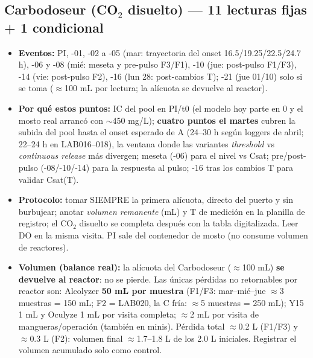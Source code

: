 \documentclass[10pt,landscape]{article}
\begin{document}
\subsection*{Carbodoseur (CO$_2$ disuelto) — 11 lecturas fijas + 1 condicional}
\begin{itemize}\setlength{\itemsep}{1pt}
\item \textbf{Eventos:} PI, -01, -02 a -05 (mar: trayectoria del onset 16.5/19.25/22.5/24.7 h), -06 y -08 (mié: meseta y pre-pulso F3/F1), -10 (jue: post-pulso F1/F3), -14 (vie: post-pulso F2), -16 (lun 28: post-cambios T); -21 (jue 01/10) solo si se toma ($\approx$100 mL por lectura; la alícuota se devuelve al reactor).
\item \textbf{Por qué estos puntos:} IC del pool en PI/t0 (el modelo hoy parte en 0 y el mosto real arrancó con $\sim$450 mg/L); \textbf{cuatro puntos el martes} cubren la subida del pool hasta el onset esperado de A (24--30 h según loggers de abril; 22--24 h en LAB016--018), la ventana donde las variantes \emph{threshold} vs \emph{continuous release} más divergen; meseta (-06) para el nivel vs Csat; pre/post-pulso (-08/-10/-14) para la respuesta al pulso; -16 tras los cambios T para validar Csat(T).
\item \textbf{Protocolo:} tomar SIEMPRE la primera alícuota, directo del puerto y sin burbujear; anotar \emph{volumen remanente} (mL) y T de medición en la planilla de registro; el CO$_2$ disuelto se completa después con la tabla digitalizada. Leer DO en la misma visita. PI sale del contenedor de mosto (no consume volumen de reactores).
\item \textbf{Volumen (balance real):} la alícuota del Carbodoseur ($\approx$100 mL) \textbf{se devuelve al reactor}: no se pierde. Las únicas pérdidas no retornables por reactor son: Alcolyzer \textbf{50 mL por muestra} (F1/F3: mar--mié--jue $\approx$3 muestras = 150 mL; F2 = LAB020, la C fría: $\approx$5 muestras = 250 mL); Y15 1 mL y Oculyze 1 mL por visita completa; $\approx$2 mL por visita de mangueras/operación (también en minis). Pérdida total $\approx$0.2 L (F1/F3) y $\approx$0.3 L (F2): volumen final $\approx$1.7--1.8 L de los 2.0 L iniciales. Registrar el volumen acumulado solo como control.
\end{itemize}
\end{document}
